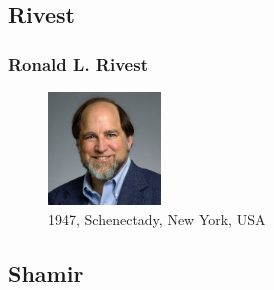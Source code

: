 \documentclass[slidestop,compress,mathserif]{beamer}
\begin{document}
\subsection{\hfill Rivest}
\begin{frame}
  \frametitle{Ronald L. Rivest}
  \begin{multicols}{2}
    \begin{figure}
      \includegraphics[width=3cm]{rivest_photo.jpg}
      \caption{1947, Schenectady, New York, USA}
    \end{figure}
    
  \end{multicols}
  
\end{frame}

\subsection{\hfill Shamir}
\end{document}
